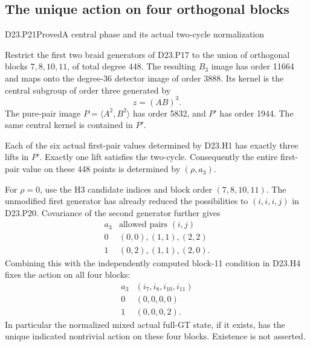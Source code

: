 \subsection{The unique action on four orthogonal blocks}

\begin{statement}{D23.P21}{Proved}{A central phase and its actual two-cycle normalization}
\end{statement}
Restrict the first two braid generators of D23.P17 to the
union of orthogonal blocks $7,8,10,11$, of total degree
448. The resulting $B_3$ image has order 11664 and maps
onto the degree-36 detector image of order 3888. Its kernel
is the central subgroup of order three generated by
\[
                         z=(AB)^3.
\]
The pure-pair image $P=\langle A^2,B^2\rangle$ has order
5832, and $P'$ has order 1944. The same central kernel is
contained in $P'$.

Each of the six actual first-pair values determined by
D23.H1 has exactly three lifts in $P'$. Exactly one lift
satisfies the two-cycle. Consequently the entire first-pair
value on these 448 points is determined by $(\rho,a_3)$.

For $\rho=0$, use the H3 candidate indices and block order
$(7,8,10,11)$. The unmodified first generator has already
reduced the possibilities to $(i,i,i,j)$ in D23.P20.
Covariance of the second generator further gives
\[
\begin{array}{c|c}
a_3&\text{allowed pairs }(i,j)\\ \hline
0&(0,0),(1,1),(2,2)\\
1&(0,2),(1,1),(2,0).
\end{array}                                                \tag{D23.P21.1}
\]
Combining this with the independently computed block-11
condition in D23.H4 fixes the action on all four blocks:
\[
\begin{array}{c|c}
a_3& (i_7,i_8,i_{10},i_{11})\\ \hline
0&(0,0,0,0)\\
1&(0,0,0,2).
\end{array}                                                \tag{D23.P21.2}
\]
In particular the normalized mixed actual full-GT state,
if it exists, has the unique indicated nontrivial action
on these four blocks. Existence is not asserted.

